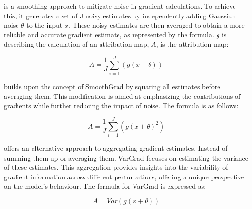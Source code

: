  \cite{smilkov2017smoothgrad} is a smoothing approach to mitigate noise in gradient calculations. To achieve this, it generates a set of J noisy estimates by independently adding Gaussian noise $\theta$ to the input $x$. These noisy estimates are then averaged to obtain a more reliable and accurate gradient estimate, as represented by the formula. $g$ is describing the calculation of an attribution map, $A$, is the attribution map:

$$ A = \frac{1}{J}\sum_{i=1}^{J} (g(x+\theta))$$

 \cite{hooker2019benchmark} builds upon the concept of SmoothGrad by squaring all estimates before averaging them. This modification is aimed at emphasizing the contributions of gradients while further reducing the impact of noise. The formula is as follows:

$$ A = \frac{1}{J}\sum_{i=1}^{J} (g(x+\theta)^2)$$

 \cite{adebayo2020sanity} offers an alternative approach to aggregating gradient estimates. Instead of summing them up or averaging them, VarGrad focuses on estimating the variance of these estimates. This aggregation provides insights into the variability of gradient information across different perturbations, offering a unique perspective on the model's behaviour. The formula for VarGrad is expressed as:

$$ A = Var(g(x+\theta))$$


%
%
%
%


